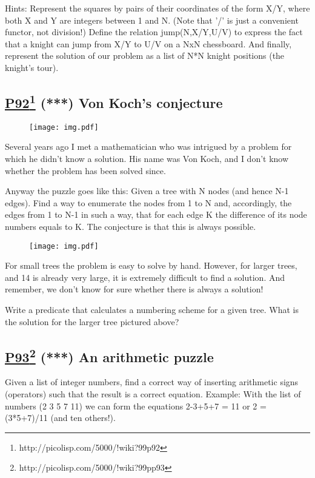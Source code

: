 \documentclass[10pt,a4paper]{article}
\begin{document}
Hints: Represent the squares by pairs of their coordinates of
the form X/Y, where both X and Y are integers between 1 and N.
(Note that '/' is just a convenient functor, not division!)
Define the relation jump(N,X/Y,U/V) to express the fact that a
knight can jump from X/Y to U/V on a NxN chessboard. And finally,
represent the solution of our problem as a list of N*N knight
positions (the knight's tour).

\subsection*{\underline{P92}\footnote{http://picolisp.com/5000/!wiki?99p92} (***) Von Koch's conjecture}

\begin{figure}[h]
\begin{flushleft}
\texttt{[image: img.pdf]}
\end{flushleft}
\end{figure}


Several years ago I met a mathematician who was intrigued by
a problem for which he didn't know a solution. His name was Von Koch,
and I don't know whether the problem has been solved since.

Anyway the puzzle goes like this: Given a tree with N nodes
(and hence N-1 edges). Find a way to enumerate the nodes from 1 to N
and, accordingly, the edges from 1 to N-1 in such a way, that for
each edge K the difference of its node numbers equals to K.
The conjecture is that this is always possible.

\begin{figure}[h]
\begin{flushleft}
\texttt{[image: img.pdf]}
\end{flushleft}
\end{figure}


For small trees the problem is easy to solve by hand. However, for
larger trees, and 14 is already very large, it is extremely difficult
to find a solution. And remember, we don't know for sure whether there is
always a solution!

Write a predicate that calculates a numbering scheme for a given
tree. What is the solution for the larger tree pictured above?

\subsection*{\underline{P93}\footnote{http://picolisp.com/5000/!wiki?99pp93} (***) An arithmetic puzzle}
Given a list of integer numbers, find a correct way of inserting
arithmetic signs (operators) such that the result is a correct equation.
Example: With the list of numbers (2 3 5 7 11) we can form the
equations  2-3+5+7 = 11  or  2 = (3*5+7)/11 (and ten others!).
\end{document}
